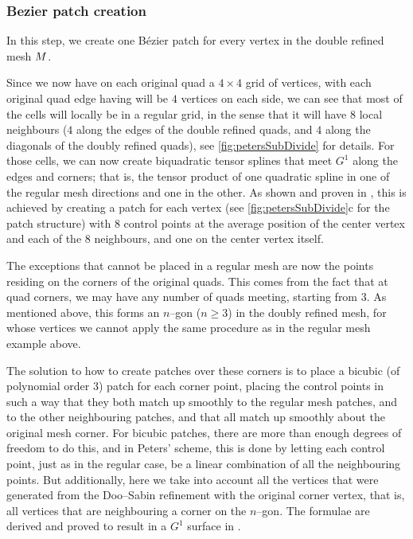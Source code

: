 \subsubsection{Bezier patch creation}
In this step, we create one B{\'e}zier patch for every vertex in the double refined mesh $\petersControlMesh$. 

Since we now have on each original quad a $4 \times 4$ grid of vertices, with each original quad edge having will be $4$ vertices on each side, we can see that most of the cells will locally be in a regular grid, in the sense that it will have $8$ local neighbours ($4$ along the edges of the double refined quads, and $4$ along the diagonals of the doubly refined quads), see \autoref{fig:petersSubDivide} for details. 
For those cells, we can now create biquadratic tensor splines that meet $G^1$ along the edges and corners; that is, the tensor product of one quadratic spline in one of the regular mesh directions and one in the other. As shown and proven in \cite{peters1992constructing}, this is achieved by creating a \Bez patch for each vertex (see \autoref{fig:petersSubDivide}c for the patch structure) with 8 \Bez control points at the average position of the center vertex and each of the 8 neighbours, and one on the center vertex itself.


%

The exceptions that cannot be placed in a regular mesh are now the points residing on the corners of the original quads. This comes from the fact that at quad corners, we may have any number of quads meeting, starting from 3.  As mentioned above, this forms an $n$--gon ($n \geq 3$) in the doubly refined mesh, for whose vertices we cannot apply the same procedure as in the regular mesh example above. 

The solution to how to create \Bez patches over these corners is to place a bicubic (of polynomial order 3) \Bez patch for each corner point, placing the \Bez control points in such a way that they both match up smoothly to the regular mesh patches, and to the other neighbouring patches, and that all match up smoothly about the original mesh corner. For bicubic \Bez patches, there are more than enough degrees of freedom to do this, and in Peters' scheme, this is done by letting each \Bez control point, just as in the regular case, be a linear combination of all the neighbouring points. But additionally, here we take into account all the vertices that were generated from the Doo--Sabin refinement with the original corner vertex, that is, all vertices that are neighbouring a corner on the $n$--gon. The formulae are derived and proved to result in a $G^1$ surface in \cite{peters1992constructing}.%

